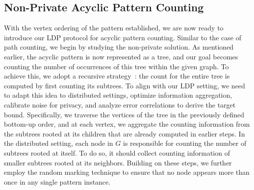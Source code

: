 \subsection{Non-Private Acyclic Pattern Counting}
\label{subsec:non_dp_pattern}


With the vertex ordering of the pattern established, we are now ready to introduce our LDP protocol for acyclic pattern counting. 
Similar to the case of path counting, we begin by studying the non-private solution.
As mentioned earlier, the acyclic pattern is now represented as a tree, and our goal becomes counting the number of occurrences of this tree within the given graph.
To achieve this, we adopt a recursive strategy{~\cite{yannakakis1981algorithms}}: the count for the entire tree is computed by first counting its subtrees.
{To align with our LDP setting, we need to adapt this idea to distributed settings, 
optimize information aggregation, 
calibrate noise for privacy, and analyze error correlations to derive the target bound.}
Specifically, we traverse the vertices of the tree in the previously defined bottom-up order, 
and at each vertex, we aggregate the counting information from the subtrees rooted at its children that are already computed in earlier steps.
In the distributed setting, each node in $G$ is responsible for counting the number of subtrees rooted at itself. 
To do so, it should collect counting information of smaller subtrees rooted at its neighbors.
Building on these steps, we further employ the random marking technique to ensure that no node appears more than once in any single pattern instance.



